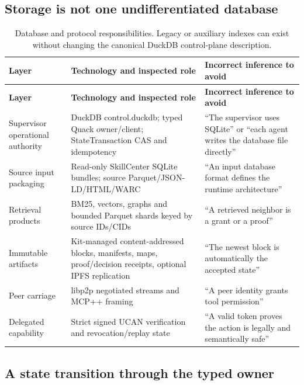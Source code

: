\documentclass{article}
\begin{document}
\subsection{Storage is not one undifferentiated database}
\begingroup
\renewcommand{\thetable}{C1}
\begin{longtable}{@{}>{\raggedright\arraybackslash}p{.24\linewidth} >{\raggedright\arraybackslash}p{.32\linewidth} >{\raggedright\arraybackslash}p{.38\linewidth}@{}}
\caption{Database and protocol responsibilities. Legacy or auxiliary indexes can exist without changing the canonical DuckDB control-plane description.}\label{tab:C1}\\
\toprule
\textbf{Layer} & \textbf{Technology and inspected role} & \textbf{Incorrect inference to avoid} \\
\midrule
\endfirsthead
\textbf{Layer} & \textbf{Technology and inspected role} & \textbf{Incorrect inference to avoid} \\
\midrule
\endhead
\bottomrule
\endlastfoot
Supervisor operational authority & DuckDB control.duckdb; typed Quack owner/client; StateTransaction CAS and idempotency & ``The supervisor uses SQLite'' or ``each agent writes the database file directly'' \\[3pt]
Source input packaging & Read-only SkillCenter SQLite bundles; source Parquet/JSON-LD/HTML/WARC & ``An input database format defines the runtime architecture'' \\[3pt]
Retrieval products & BM25, vectors, graphs and bounded Parquet shards keyed by source IDs/CIDs & ``A retrieved neighbor is a grant or a proof'' \\[3pt]
Immutable artifacts & Kit-managed content-addressed blocks, manifests, maps, proof/decision receipts, optional IPFS replication & ``The newest block is automatically the accepted state'' \\[3pt]
Peer carriage & libp2p negotiated streams and MCP++ framing & ``A peer identity grants tool permission'' \\[3pt]
Delegated capability & Strict signed UCAN verification and revocation/replay state & ``A valid token proves the action is legally and semantically safe'' \\[3pt]
\end{longtable}
\endgroup


\subsection{A state transition through the typed owner}
\end{document}
